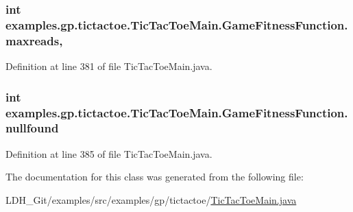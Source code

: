 \hypertarget{classexamples_1_1gp_1_1tictactoe_1_1_tic_tac_toe_main_1_1_game_fitness_function_adb0cabead09aa776a26dd7fb42b3f601}{
\subsubsection[{maxreads}]{\setlength{\rightskip}{0pt plus 5cm}int examples.\-gp.\-tictactoe.\-Tic\-Tac\-Toe\-Main.\-Game\-Fitness\-Function.\-maxreads\hspace{0.3cm}{\ttfamily [static]}, {\ttfamily [private]}}}\label{classexamples_1_1gp_1_1tictactoe_1_1_tic_tac_toe_main_1_1_game_fitness_function_adb0cabead09aa776a26dd7fb42b3f601}


Definition at line 381 of file Tic\-Tac\-Toe\-Main.\-java.

\hypertarget{classexamples_1_1gp_1_1tictactoe_1_1_tic_tac_toe_main_1_1_game_fitness_function_a4744a6b1ab6db4cb9e01de7a40c6e9f4}{
\subsubsection[{nullfound}]{\setlength{\rightskip}{0pt plus 5cm}int examples.\-gp.\-tictactoe.\-Tic\-Tac\-Toe\-Main.\-Game\-Fitness\-Function.\-nullfound\hspace{0.3cm}{\ttfamily [private]}}}\label{classexamples_1_1gp_1_1tictactoe_1_1_tic_tac_toe_main_1_1_game_fitness_function_a4744a6b1ab6db4cb9e01de7a40c6e9f4}


Definition at line 385 of file Tic\-Tac\-Toe\-Main.\-java.



The documentation for this class was generated from the following file\-:\begin{DoxyCompactItemize}
\item 
L\-D\-H\-\_\-\-Git/examples/src/examples/gp/tictactoe/\hyperlink{_tic_tac_toe_main_8java}{Tic\-Tac\-Toe\-Main.\-java}\end{DoxyCompactItemize}
